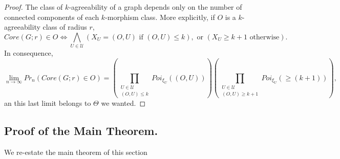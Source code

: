 \documentclass[11pt,notitlepage]{report}
\theoremstyle{definition}
\newcommand{\Ln}{\lim\limits_{n\to \infty}}
\begin{document}
\begin{proof}
	The class of $k$-agreeability of a graph depends only on the number
	of connected components of each $k$-morphism class. More explicitly, 
	if $O$ is a $k$-agreeability class of radius $r$, 
	\[Core(G;r)\in O \iff \bigwedge_{U\in \mathcal{U}} (X_U=(O,U) \text{ if }(O,U)\leq k), \text{ or }  (X_U\geq k+1 \text{ otherwise}).\]
	In consequence,
	\[ \Ln Pr_n(Core(G;r)\in O) = \left(\prod_{\substack{U\in \mathcal{U}\\(O,U)\leq k}} Poi_{\xi_U}((O,U)) \right) \left(\prod_{\substack{U\in \mathcal{U}\\(O,U)\geq k+1}}
	Poi_{\xi_U}(\geq (k+1)) \right),\]
	an this last limit belongs to $\Theta$ we wanted.   
\end{proof}

\subsection{Proof of the Main Theorem.}
 
We re-estate the main theorem of this section 
\end{document}
